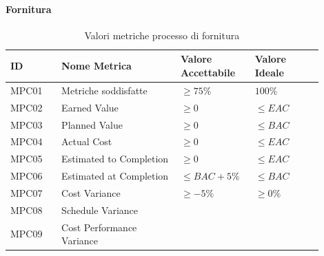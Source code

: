 \documentclass[a4paper,12pt]{article}
\begin{document}
                \paragraph{Fornitura} \mbox{}
                    \begin{longtable}{|M{0.15\linewidth}|M{0.35\linewidth}|M{0.2\linewidth}|M{0.2\linewidth}|}

                        \caption{Valori metriche processo di fornitura} \\
                        \hline
                        \textbf{ID} & \textbf{Nome Metrica} & \textbf{Valore Accettabile} & \textbf{Valore Ideale} \\
                        \hline
                        \endhead

                        MPC01 & Metriche soddisfatte & $\ge 75\%$ & $100\%$ \\
                        \hline

                        MPC02 & Earned Value & $\ge 0$ & $\le EAC$ \\
                        \hline
                        
                        MPC03 & Planned Value & $\ge 0$ & $\le BAC$ \\
                        \hline
                        
                        MPC04 & Actual Cost & $\ge 0$ & $\le EAC$\\
                        \hline
                        
                        MPC05 & Estimated to Completion & $\ge 0$ & $\le EAC$ \\
                        \hline

                        MPC06 & Estimated at Completion & $\le BAC + 5\%$ & $\le BAC$ \\
                        \hline

                        MPC07 & Cost Variance & $\ge -5\%$ & $\ge 0\%$\\
                        \hline

                        MPC08 & Schedule Variance & &\\
                        \hline

                        MPC09 & Cost Performance Variance & & \\
                        \hline

                    \end{longtable}
\end{document}
